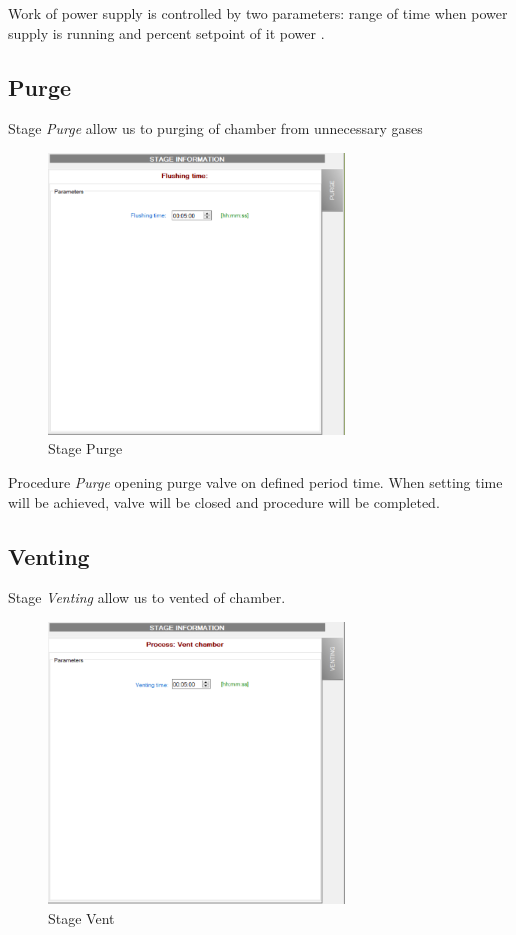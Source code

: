 Work of power supply is controlled by two parameters: range of time when power supply is running and percent  setpoint of it power .

\subsection{Purge}

Stage \textit{Purge} allow us to purging of chamber from unnecessary gases

	\begin{figure}[!h] 
	\centering \includegraphics[width=0.7\textwidth]{Graphic/Programs/Purge.png}	
	\caption{Stage Purge}
	\label{stage_purge}
	\end{figure}
	\FloatBarrier

Procedure \textit{Purge} opening purge valve on defined period time. When setting time will be achieved, valve will be closed and procedure will be completed. 

\subsection{Venting}

Stage \textit{Venting} allow us to vented of chamber.

	\begin{figure}[!h] 
	\centering \includegraphics[width=0.7\textwidth]{Graphic/Programs/Venting.png}	
	\caption{Stage Vent}
	\label{stage_vent}
	\end{figure}
	\FloatBarrier

